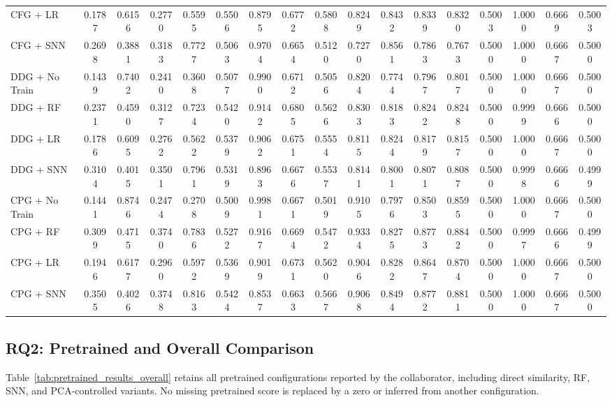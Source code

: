 \documentclass[authoryear,final,5p,times,twocolumn]{elsarticle}
\theoremstyle{plain}
\begin{document}
\begin{table}[t]
{\begin{tabular}{l*{16}{c}}
CFG + LR & 0.1787 & 0.6156 & 0.2770 & 0.5595 & 0.5506 & 0.8795 & 0.6772 & 0.5808 & 0.8249 & 0.8432 & 0.8339 & 0.8320 & 0.5003 & 1.0000 & 0.6669 & 0.5003 \\
CFG + SNN & 0.2698 & 0.3881 & 0.3183 & 0.7727 & 0.5063 & 0.9704 & 0.6654 & 0.5120 & 0.7270 & 0.8561 & 0.7863 & 0.7673 & 0.5000 & 1.0000 & 0.6667 & 0.5000 \\
DDG + No Train & 0.1439 & 0.7402 & 0.2410 & 0.3608 & 0.5077 & 0.9900 & 0.6712 & 0.5056 & 0.8204 & 0.7744 & 0.7967 & 0.8017 & 0.5000 & 1.0000 & 0.6667 & 0.5000 \\
DDG + RF & 0.2371 & 0.4590 & 0.3127 & 0.7234 & 0.5420 & 0.9142 & 0.6805 & 0.5626 & 0.8303 & 0.8183 & 0.8242 & 0.8248 & 0.5000 & 0.9999 & 0.6666 & 0.5000 \\
DDG + LR & 0.1786 & 0.6095 & 0.2762 & 0.5622 & 0.5379 & 0.9062 & 0.6751 & 0.5554 & 0.8115 & 0.8244 & 0.8179 & 0.8157 & 0.5000 & 1.0000 & 0.6667 & 0.5000 \\
DDG + SNN & 0.3104 & 0.4015 & 0.3501 & 0.7961 & 0.5319 & 0.8963 & 0.6676 & 0.5537 & 0.8141 & 0.8001 & 0.8071 & 0.8087 & 0.5000 & 0.9998 & 0.6666 & 0.4999 \\
CPG + No Train & 0.1441 & 0.8746 & 0.2474 & 0.2708 & 0.5009 & 0.9981 & 0.6671 & 0.5019 & 0.9105 & 0.7976 & 0.8503 & 0.8595 & 0.5000 & 1.0000 & 0.6667 & 0.5000 \\
CPG + RF & 0.3099 & 0.4715 & 0.3740 & 0.7836 & 0.5272 & 0.9167 & 0.6694 & 0.5472 & 0.9334 & 0.8275 & 0.8773 & 0.8842 & 0.5000 & 0.9997 & 0.6666 & 0.4999 \\
CPG + LR & 0.1946 & 0.6177 & 0.2960 & 0.5972 & 0.5369 & 0.9019 & 0.6731 & 0.5620 & 0.9046 & 0.8282 & 0.8647 & 0.8704 & 0.5000 & 1.0000 & 0.6667 & 0.5000 \\
CPG + SNN & 0.3505 & 0.4026 & 0.3748 & 0.8163 & 0.5424 & 0.8537 & 0.6633 & 0.5667 & 0.9068 & 0.8494 & 0.8772 & 0.8811 & 0.5000 & 1.0000 & 0.6667 & 0.5000 \\
\bottomrule
\end{tabular}%
}
\end{table}

\subsection{RQ2: Pretrained and Overall Comparison}
\label{sec:rq2}

Table~\ref{tab:pretrained_results_overall} retains all pretrained configurations
reported by the collaborator, including direct similarity, RF, SNN, and
PCA-controlled variants. No missing pretrained score is replaced by a zero or
inferred from another configuration.
\end{document}
